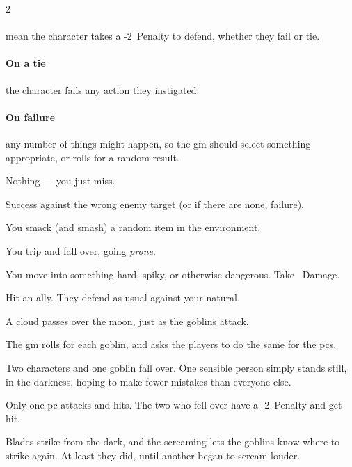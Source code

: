 \begin{multicols}{2}
\paragraph{}
mean the character takes a -2~Penalty to defend, whether they fail or tie.

\paragraph{On a tie}
the character fails any \gls{action} they instigated.

\paragraph{On failure}
any number of things might happen, so the \gls{gm} should select something appropriate, or rolls for a random result.

\begin{dlist}
  \item Nothing --- you just miss.
  \item Success against the wrong enemy target (or if there are none, failure).
  \item You smack (and smash) a random item in the environment.
  \item You trip and fall over, going \textit{prone}.
  \item You move into something hard, spiky, or otherwise dangerous.
  Take ~Damage.
  \item Hit an ally.
  They defend as usual against your \gls{natural}.
\end{dlist}

\begin{exampletext}
  A cloud passes over the moon, just as the goblins attack.

  {\sffamily
    The \gls{gm} rolls  for each goblin, and asks the players to do the same for the \glspl{pc}.
  }

  Two characters and one goblin fall over.
  One sensible person simply stands still, in the darkness, hoping to make fewer mistakes than everyone else.

  {\sffamily
    Only one \gls{pc} attacks and hits.
    The two who fell over have a -2~Penalty and get hit.
  }

  Blades strike from the dark, and the screaming lets the goblins know where to strike again.
  At least they did, until another began to scream louder.


\end{exampletext}
\end{multicols}
